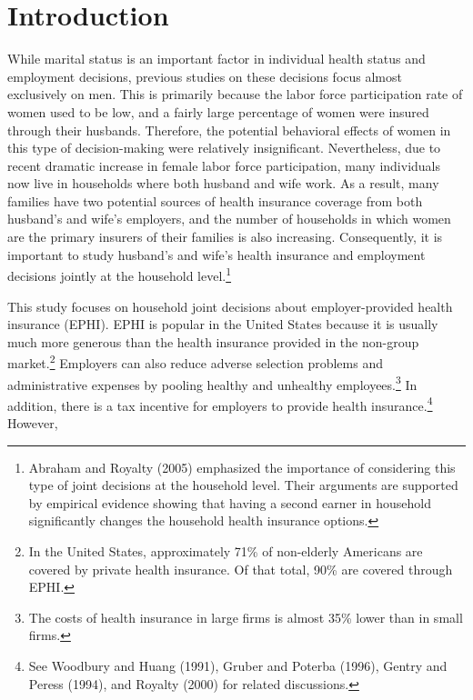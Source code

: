\documentclass[legno,11pt]{article}
\begin{document}


\newpage
\section{Introduction}\label{section1}
While marital status is an important factor in individual health
status and employment decisions, previous studies on these decisions
focus almost exclusively on men. This is primarily because the labor
force participation rate of women used to be low, and a fairly large
percentage of women were insured through their husbands. Therefore,
the potential behavioral effects of women in this type of
decision-making were relatively insignificant. Nevertheless, due to
recent dramatic increase in female labor force participation, many
individuals now live in households where both husband and wife work.
As a result, many families have two potential sources of health
insurance coverage from both husband's and wife's employers, and the
number of households in which women are the primary insurers of
their families is also increasing. Consequently, it is important to
study husband's and wife's health insurance and employment decisions
jointly at the household level.\footnote{Abraham and Royalty (2005)
emphasized the importance of considering this type of joint
decisions at the household level. Their arguments are supported by
empirical evidence showing that having a second earner in household
significantly changes the household health insurance options. }
\par
This study focuses on household joint decisions about
employer-provided health insurance (EPHI). EPHI is popular in the
United States because it is usually much more generous than the
health insurance provided in the non-group market.\footnote{In the
United States, approximately 71\% of non-elderly Americans are
covered by private health insurance. Of that total, 90\% are covered
through EPHI.} Employers can also reduce adverse selection problems
and administrative expenses by pooling healthy and unhealthy
employees.\footnote{The costs of health insurance in large firms is
almost 35\% lower than in small firms.} In addition, there is a tax
incentive for employers to provide health insurance.\footnote{See
Woodbury and Huang (1991), Gruber and Poterba (1996), Gentry and
Peress (1994), and Royalty (2000) for related discussions.} However,
\end{document}
